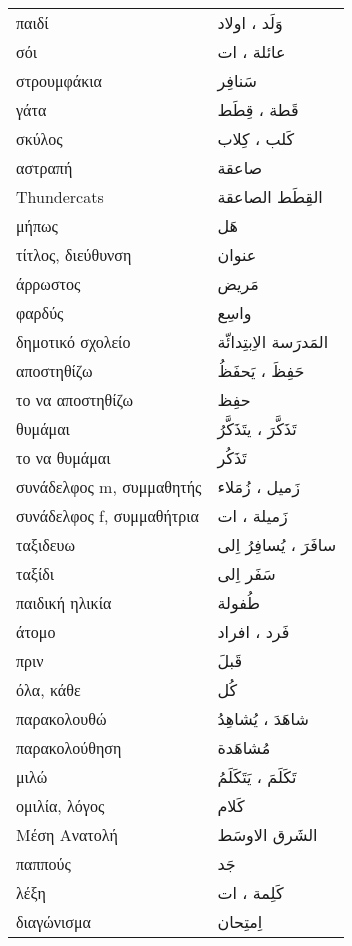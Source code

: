 \documentclass[twocolumn,a4paper]{article}
\newcommand{\ar}[1]{\textarabic{#1}}
\newcommand{\pl}{\raisebox{0.15ex}{\footnotesize ◍}}
\newcommand{\normpl}[1]{\ar{ #1، ات }}
\newcommand{\vrf}{\raisebox{0.15ex}{\footnotesize ◉}}
\newcommand{\mas}{\raisebox{0.15ex}{\footnotesize ◫}}
\begin{document}
\begin{mpsupertabular}{ P{0.5\textwidth} P{0.5\textwidth} }
παιδί \pl      & \ar{ وَلَد ، اولاد } \\
σόι \pl       & \normpl{ عائلة } \\
στρουμφάκια    & \ar{ سَنافِر } \\
γάτα \pl       & \ar{ قَطة ، قِطَط } \\
σκύλος \pl     & \ar{ كَلب ، كِلاب  } \\
αστραπή        & \ar{ صاعقة } \\
Τhundercats   & \ar{ القِطَط الصاعقة } \\
μήπως          & \ar{ هَل } \\
τίτλος, διεύθυνση & \ar{ عنوان } \\
άρρωστος       & \ar{ مَريض } \\
φαρδύς         & \ar{ واسِع } \\
δημοτικό σχολείο    & \ar{ المَدرَسة الاِبتِدائّة } \\
αποστηθίζω \vrf & \ar{ حَفِظَ ، يَحفَظُ } \\
το να αποστηθίζω \mas & \ar{ حفِظ } \\
θυμάμαι \vrf   & \ar{ تَذَكَّرَ ، يتَذَكَّرُ } \\  %
το να θυμάμαι \mas & \ar{ تَذَكُر } \\
συνάδελφος m, συμμαθητής \pl & \ar{ زَميل ، زُمَلاء } \\
συνάδελφος f, συμμαθήτρια \pl & \normpl{ زَميلة } \\
ταξιδευω \vrf  & \ar{ سافَرَ ، يُسافِرُ اِلى } \\
ταξίδι \mas    & \ar{ سَفَر اِلى } \\
παιδική ηλικία & \ar{ طُفولة } \\
άτομο \pl      & \ar{ فَرد ، افراد } \\
πριν           & \ar{ قَبلَ } \\
όλα, κάθε       & \ar{ كُل } \\
παρακολουθώ \vrf & \ar{ شاهَدَ ، يُشاهِدُ } \\
παρακολούθηση \mas & \ar{ مُشاهَدة } \\
μιλώ \vrf      & \ar{ تَكَلَمَ ، يَتَكَلَمُ } \\
ομιλία, λόγος \mas & \ar{ كَلام } \\
Μέση Ανατολή   & \ar{ الشَرق الاوسَط } \\
παππούς        & \ar{ جَد } \\
λέξη \pl       & \normpl{ كَلِمة } \\
διαγώνισμα     & \ar{ اِمتِحان } \\

\end{mpsupertabular}
\end{document}
